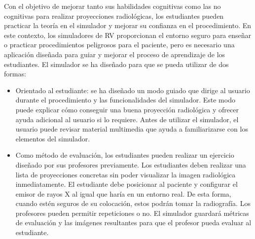 Con el objetivo de mejorar tanto sus habilidades cognitivas como las no cognitivas para realizar proyecciones radiológicas, los estudiantes pueden practicar la teoría en el simulador y mejorar su confianza en el procedimiento. En este contexto, los simuladores de \ac{RV} proporcionan el entorno seguro para enseñar o practicar procedimientos peligrosos para el paciente, pero es necesario una aplicación diseñada para guiar y mejorar el proceso de aprendizaje de los estudiantes. El simulador se ha diseñado para que se pueda utilizar de dos formas:
\begin{itemize}
    \item Orientado al estudiante: se ha diseñado un modo guiado que dirige al usuario durante el procedimiento y las funcionalidades del simulador. Este modo puede explicar cómo conseguir una buena proyección radiológica y ofrecer ayuda adicional al usuario si lo requiere. Antes de utilizar el simulador, el usuario puede revisar material multimedia que ayuda a familiarizarse con los elementos del simulador.
    
    \item Como método de evaluación, los estudiantes pueden realizar un ejercicio diseñado por sus profesores previamente. Los estudiantes deben realizar una lista de proyecciones concretas sin poder visualizar la imagen radiológica inmediatamente. El estudiante debe posicionar al paciente y configurar el emisor de rayos X al igual que haría en un entorno real. De esta forma, cuando estén seguros de su colocación, estos podrán tomar la radiografía. Los profesores pueden permitir repeticiones o no. El simulador guardará métricas de evaluación y las imágenes resultantes para que el profesor pueda evaluar al estudiante.
    
\end{itemize}







